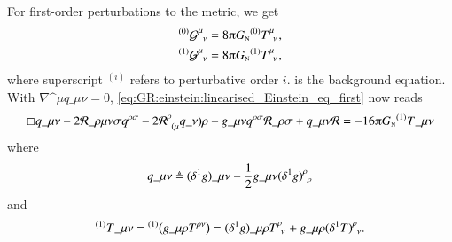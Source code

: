 {For first-order perturbations to the metric, we get~\citep{jokelaGravitationalWaveMemory2022}
\begin{subequations}
    \begin{align}
        {}^{(0)}\mathcal{G}\indices{^\mu_\nu} &= 8\piGN {}^{(0)}T\indices{^\mu_\nu} \label{eq:GR:einstein:linearised_Einstein_eq_zeroth},\\
        {}^{(1)}\mathcal{G}\indices{^\mu_\nu} &= 8\piGN {}^{(1)}T\indices{^\mu_\nu} \label{eq:GR:einstein:linearised_Einstein_eq_first},
    \end{align}
\end{subequations}
where superscript ${}^{(i)}$ refers to perturbative order $i$.  is the background equation. %
{\newcommand{\delg}{q}%
With $\nabla\^{\mu}\delg\_{\mu\nu}=0$, \cref{eq:GR:einstein:linearised_Einstein_eq_first} now reads~\citep{jokelaGravitationalWaveMemory2022}
\begin{equation}
    \sq \delg\_{\mu\nu} - 2\mathcal{R}\_{\rho\mu\nu\sigma}\delg\^{\rho\sigma} - 2 \mathcal{R}\indices{^\rho_{(\mu}}\delg\_{\nu)\rho}
    - g\_{\mu\nu} \delg\^{\rho\sigma}\mathcal{R}\_{\rho\sigma} + \delg\_{\mu\nu} \mathcal{R} = - 16\piGN {}^{(1)}T\_{\mu\nu}
\end{equation}
where
\begin{equation}
    \delg\_{\mu\nu} \triangleq (\delta^{1} g)\_{\mu\nu} - \frac{1}{2}  g\_{\mu\nu} (\delta^{1} g)\indices{^\rho_\rho} 
\end{equation}
and
\begin{equation}
    {}^{(1)}T\_{\mu\nu} = {}^{(1)}\pclosed{g\_{\mu\rho}T\^{\rho\nu}} = (\delta^1 g)\_{\mu\rho}T\indices{^\rho_\nu}+ g\_{\mu\rho} (\delta^1 T)\indices{^\rho_\nu}.
\end{equation}
}




}

